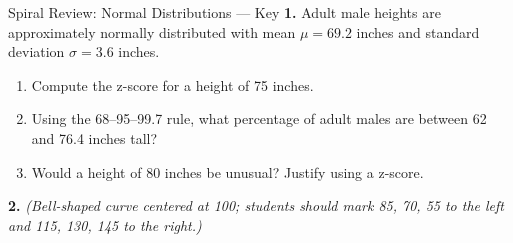 \documentclass[10pt]{article}
\begin{document}
\namedateperiod

\vspace{0.15in}

\begin{notesbox}{Spiral Review: Normal Distributions --- Key}
\textbf{1.} Adult male heights are approximately normally distributed with mean
$\mu = 69.2$ inches and standard deviation $\sigma = 3.6$ inches.

\begin{enumerate}[label=\alph*.]
  \item Compute the z-score for a height of 75 inches.
  \item Using the 68--95--99.7 rule, what percentage of adult males are between
        62 and 76.4 inches tall?
  \item Would a height of 80 inches be unusual? Justify using a z-score.
\end{enumerate}

\vspace{0.1in}
\textbf{2.} \textit{(Bell-shaped curve centered at 100; students should mark 85, 70, 55 to the left and 115, 130, 145 to the right.)}

\vspace{1.4in}
\end{notesbox}
\end{document}
